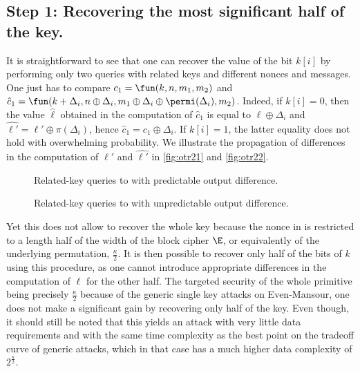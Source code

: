\subsection{Step 1: Recovering the most significant half of the key.}

It is straightforward to see that one can recover the value
of the bit $k[i]$ by performing only two queries with related keys
and different nonces and messages. One just has to compare
$c_1 = \fun(k, n, m_1, m_2)$ and
$\hat{c}_1 = \fun(k + \Delta_i,n \oplus \Delta_i,
m_1 \oplus \Delta_i \oplus \permi(\Delta_i), m_2)$. Indeed, if $k[i] = 0$,
then the value $\hat{\ell}$ obtained in the computation of $\hat{c}_1$ is equal to
$\ell \oplus \Delta_i$ and $\hat{\ell'} = \ell' \oplus \pi(\Delta_i)$, hence
$\hat{c}_1 = c_1 \oplus \Delta_i$. If $k[i] = 1$, the latter equality does not
hold with overwhelming probability.
We illustrate the propagation of differences in the computation of $\ell'$ and $\hat{\ell'}$ in
\autoref{fig:otr21} and \autoref{fig:otr22}.


\begin{figure}[!htb]
\begin{center}

\caption{Related-key queries to \proestotr with predictable output difference.\label{fig:otr21}}
\end{center}
\end{figure}

\begin{figure}[!htb]
\begin{center}

\caption{Related-key queries to \proestotr with unpredictable output difference.\label{fig:otr22}}
\end{center}
\end{figure}

Yet this does not allow to recover the whole key because the nonce in \proestotr is restricted to a length
half of the width of the block cipher $\E$, or equivalently of the underlying \proest permutation,
\ie $\frac{\kappa}{2}$. It is then possible to recover only
half of the bits of $k$ using this procedure, as one cannot introduce appropriate differences in
the computation of $\ell$ for the other half. The targeted security of the
whole primitive being precisely $\frac{\kappa}{2}$ because of the generic single key
attacks on Even-Mansour,
one does not make a significant gain by recovering only half of the key.
Even though, it should still be noted that this yields an
attack with very little data requirements and with the same time complexity as the best
point on the tradeoff curve of generic attacks, which in that case has a much higher data complexity of
$2^\frac{\kappa}{2}$.


